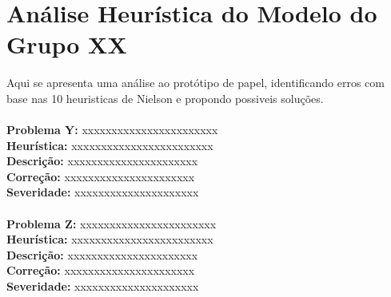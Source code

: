 \documentclass{article}
\begin{document}
\section*{Análise Heurística do Modelo do Grupo XX}
Aqui se apresenta uma análise ao protótipo de papel, identificando erros com base nas 10 heuristicas de Nielson e propondo possiveis soluções.\\
\\
\textbf{Problema Y:} xxxxxxxxxxxxxxxxxxxxxxx \\
\textbf{Heurística:} xxxxxxxxxxxxxxxxxxxxxxxx\\
\textbf{Descrição:} xxxxxxxxxxxxxxxxxxxxxx\\
\textbf{Correção:} xxxxxxxxxxxxxxxxxxxxxx\\
\textbf{Severidade:} xxxxxxxxxxxxxxxxxxxxx\\
\\
\textbf{Problema Z:} xxxxxxxxxxxxxxxxxxxxxxx \\
\textbf{Heurística:} xxxxxxxxxxxxxxxxxxxxxxxx\\
\textbf{Descrição:} xxxxxxxxxxxxxxxxxxxxxx\\
\textbf{Correção:} xxxxxxxxxxxxxxxxxxxxxx\\
\textbf{Severidade:} xxxxxxxxxxxxxxxxxxxxx\\
\end{document}

